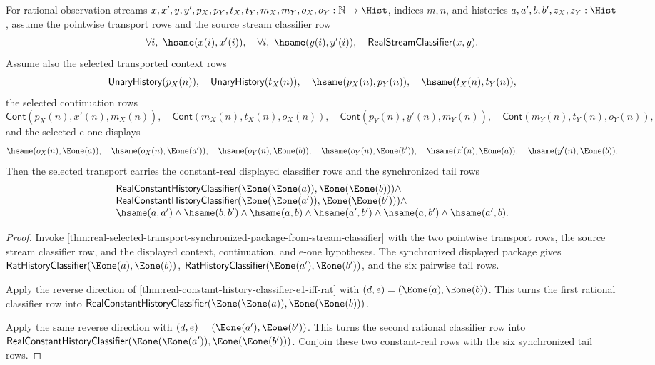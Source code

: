\begin{theorem}
\label{thm:real-selected-transport-constant-real-classifier-package}
For rational-observation streams
$x,x',y,y',p_X,p_Y,t_X,t_Y,m_X,m_Y,o_X,o_Y:\mathbb{N}\to\Hist$,
indices $m,n$, and histories $a,a',b,b',z_X,z_Y:\Hist$, assume the pointwise
transport rows and the source stream classifier row
$$
\forall i,\ \hsame(x(i),x'(i)),\quad
\forall i,\ \hsame(y(i),y'(i)),\quad
\mathsf{RealStreamClassifier}(x,y).
$$
Assume also the selected transported context rows
$$
\mathsf{UnaryHistory}(p_X(n)),\quad
\mathsf{UnaryHistory}(t_X(n)),\quad
\hsame(p_X(n),p_Y(n)),\quad
\hsame(t_X(n),t_Y(n)),
$$
the selected continuation rows
$$
\mathsf{Cont}(p_X(n),x'(n),m_X(n)),\quad
\mathsf{Cont}(m_X(n),t_X(n),o_X(n)),
\quad\mathsf{Cont}(p_Y(n),y'(n),m_Y(n)),\quad
\mathsf{Cont}(m_Y(n),t_Y(n),o_Y(n)),
$$
and the selected e-one displays
$$
\hsame(o_X(n),\Eone(a)),\quad
\hsame(o_X(n),\Eone(a')),\quad
\hsame(o_Y(n),\Eone(b)),\quad
\hsame(o_Y(n),\Eone(b')),\quad
\hsame(x'(n),\Eone(a)),\quad
\hsame(y'(n),\Eone(b)).
$$
Then the selected transport carries the constant-real displayed classifier rows
and the synchronized tail rows
$$
\begin{array}{l}
\mathsf{RealConstantHistoryClassifier}(\Eone(\Eone(a)),\Eone(\Eone(b)))\land\\
\mathsf{RealConstantHistoryClassifier}(\Eone(\Eone(a')),\Eone(\Eone(b')))\land\\
\hsame(a,a')\land
\hsame(b,b')\land
\hsame(a,b)\land
\hsame(a',b')\land
\hsame(a,b')\land
\hsame(a',b).
\end{array}
$$
\end{theorem}
\begin{proof}
Invoke
\autoref{thm:real-selected-transport-synchronized-package-from-stream-classifier}
with the two pointwise transport rows, the source stream classifier row, and the
displayed context, continuation, and e-one hypotheses. The synchronized
displayed package gives
$\mathsf{RatHistoryClassifier}(\Eone(a),\Eone(b))$,
$\mathsf{RatHistoryClassifier}(\Eone(a'),\Eone(b'))$, and the six pairwise tail
rows.

Apply the reverse direction of
\autoref{thm:real-constant-history-classifier-e1-iff-rat} with
$(d,e)=(\Eone(a),\Eone(b))$. This turns the first rational classifier row into
$\mathsf{RealConstantHistoryClassifier}(\Eone(\Eone(a)),\Eone(\Eone(b)))$.

Apply the same reverse direction with
$(d,e)=(\Eone(a'),\Eone(b'))$. This turns the second rational classifier row
into
$\mathsf{RealConstantHistoryClassifier}(\Eone(\Eone(a')),\Eone(\Eone(b')))$.
Conjoin these two constant-real rows with the six synchronized tail rows.
\end{proof}


